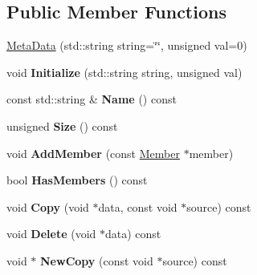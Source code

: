 \subsection*{Public Member Functions}
\begin{DoxyCompactItemize}
\item 
\hyperlink{classDCEngine_1_1MetaData_a4c1e94d77252d5c7a419e5a8c8d80011}{Meta\-Data} (std\-::string string=\char`\"{}\char`\"{}, unsigned val=0)
\item 
\hypertarget{classDCEngine_1_1MetaData_a557168a8c01f1f7699e02abfeedafa62}{void {\bfseries Initialize} (std\-::string string, unsigned val)}\label{classDCEngine_1_1MetaData_a557168a8c01f1f7699e02abfeedafa62}

\item 
\hypertarget{classDCEngine_1_1MetaData_a003131a65e2a42a68108d8deefd26abe}{const std\-::string \& {\bfseries Name} () const }\label{classDCEngine_1_1MetaData_a003131a65e2a42a68108d8deefd26abe}

\item 
\hypertarget{classDCEngine_1_1MetaData_a186b2e7d9241550d5b27c77030c20c47}{unsigned {\bfseries Size} () const }\label{classDCEngine_1_1MetaData_a186b2e7d9241550d5b27c77030c20c47}

\item 
\hypertarget{classDCEngine_1_1MetaData_a7e547e46aec4d6b2e9425ec4ff67ff95}{void {\bfseries Add\-Member} (const \hyperlink{classDCEngine_1_1Member}{Member} $\ast$member)}\label{classDCEngine_1_1MetaData_a7e547e46aec4d6b2e9425ec4ff67ff95}

\item 
\hypertarget{classDCEngine_1_1MetaData_a24e28764f0d849e5151fc83ad4076664}{bool {\bfseries Has\-Members} () const }\label{classDCEngine_1_1MetaData_a24e28764f0d849e5151fc83ad4076664}

\item 
\hypertarget{classDCEngine_1_1MetaData_a1024ffbddb2b38623fb7b0b997cf0f58}{void {\bfseries Copy} (void $\ast$data, const void $\ast$source) const }\label{classDCEngine_1_1MetaData_a1024ffbddb2b38623fb7b0b997cf0f58}

\item 
\hypertarget{classDCEngine_1_1MetaData_ae02f5e30ce1a3cd2e532fa28acaab4ce}{void {\bfseries Delete} (void $\ast$data) const }\label{classDCEngine_1_1MetaData_ae02f5e30ce1a3cd2e532fa28acaab4ce}

\item 
\hypertarget{classDCEngine_1_1MetaData_abceaa45fd0a34377dc45bc3445a02cdd}{void $\ast$ {\bfseries New\-Copy} (const void $\ast$source) const }\label{classDCEngine_1_1MetaData_abceaa45fd0a34377dc45bc3445a02cdd}


\end{DoxyCompactItemize}

